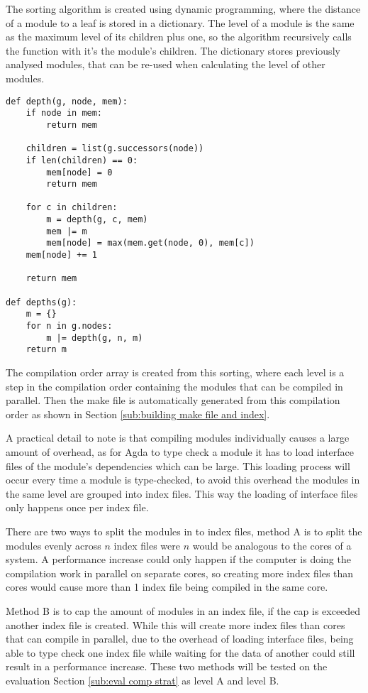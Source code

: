 The sorting algorithm is created using dynamic programming, where the distance
of a module to a leaf is stored in a dictionary. The level of a module is the
same as the maximum level of its children plus one, so the algorithm
recursively calls the function with it's the module's children. The dictionary
stores previously analysed modules, that can be re-used when calculating the
level of other modules.

\begin{lstlisting}
def depth(g, node, mem):
    if node in mem:
        return mem

    children = list(g.successors(node))
    if len(children) == 0:
        mem[node] = 0
        return mem

    for c in children:
        m = depth(g, c, mem)
        mem |= m
        mem[node] = max(mem.get(node, 0), mem[c])
    mem[node] += 1

    return mem

def depths(g):
    m = {}
    for n in g.nodes:
        m |= depth(g, n, m)
    return m
\end{lstlisting}

The compilation order array is created from this sorting, where each level is a
step in the compilation order containing the modules that can be compiled in
parallel. Then the make file is automatically generated from this compilation
order as shown in Section \ref{sub:building make file and index}.

A practical detail to note is that compiling modules individually causes a
large amount of overhead, as for Agda to type check a module it has to load
interface files of the module's dependencies which can be large. This loading
process will occur every time a module is type-checked, to avoid this overhead
the modules in the same level are grouped into index files. This way the
loading of interface files only happens once per index file.

There are two ways to split the modules in to index files, method A is to split
the modules evenly across \(n\) index files were \(n\) would be analogous to
the cores of a system. A performance increase could only happen if the computer
is doing the compilation work in parallel on separate cores, so creating more
index files than cores would cause more than 1 index file being compiled in the
same core.

Method B is to cap the amount of modules in an index file, if the cap is
exceeded another index file is created. While this will create more index files
than cores that can compile in parallel, due to the overhead of loading
interface files, being able to type check one index file while waiting for the
data of another could still result in a performance increase. These two methods
will be tested on the evaluation Section \ref{sub:eval comp strat} as level A
and level B.


